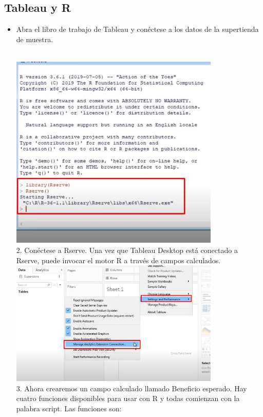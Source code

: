 \documentclass[preprint,12pt]{elsarticle}
\begin{document}
		\subsection{Tableau y R}
			\begin{itemize}
				\item 
				Abra el libro de trabajo de Tableau y conéctese a los datos de la supertienda de muestra.
				
						\\	\includegraphics[width=10cm]{./IMAGENES/8.1}
				\\ 2. Conéctese a Rserve. Una vez que Tableau Desktop está conectado a Rserve, puede invocar el
				motor R a través de campos calculados.
				\\	\includegraphics[width=10cm]{./IMAGENES/8.2}
				\\ 3. Ahora crearemos un campo calculado llamado Beneficio esperado.
				Hay cuatro funciones disponibles para usar con R y todas comienzan con la palabra script. Las
				funciones son:

\end{itemize}
\end{document}
